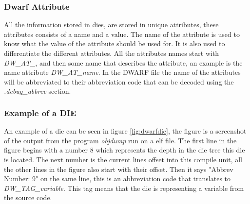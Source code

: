 

\subsubsection{Dwarf Attribute}\label{sec:dwarfattributes}
 


All the information stored in \glspl{die}, are stored in unique attributes, these attributes consists of a name and a value.
The name of the attribute is used to know what the value of the attribute should be used for.
It is also used to differentiate the different attributes.
All the attributes names start with \emph{DW\_AT\_}, and then some name that describes the attribute, an example is the name attribute \emph{DW\_AT\_name}.
In the \gls{DWARF} file the name of the attributes will be abbreviated to their abbreviation code that can be decoded using the \emph{.debug\_abbrev} section.


\subsubsection{Example of a DIE}
An example of a \gls{die} can be seen in figure \ref{fig:dwarfdie}, the figure is a screenshot of the output from the program \emph{objdump} run on a \gls{elf} file.
The first line in the figure begins with a number $8$ which represents the depth in the \gls{die} tree this \gls{die} is located.
The next number is the current lines offset into this compile unit, all the other lines in the figure also start with their offset.
Then it says "Abbrev Number: 9" on the same line, this is an abbreviation code that translates to \emph{DW\_TAG\_variable}.
This tag means that the \gls{die} is representing a variable from the source code.


